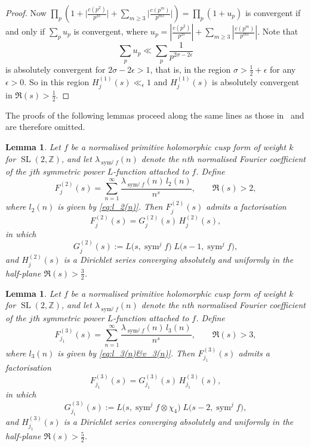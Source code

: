 \documentclass[10pt]{amsart}
\newtheorem{lemma}[theorem]{Lemma}
\begin{document}
\begin{proof}
         Now $\prod_p\left(1 + \bigg|\frac{c(p^2)}{p^{2s}}\bigg|+ \sum_{m\geq 3} \bigg|\frac{c(p^m)}{p^{ms}}\bigg|\right) = \prod_p\left(1+u_p\right)$ is convergent if and only if $\sum_pu_p$ is convergent, where $u_p = |\frac{c(p^2)}{p^{2s}}|+\sum_{m \geq 3}|\frac
         {c(p^m)}{p^{ms}}|$. Note that $$ \sum_pu_p \ll  \sum_p \frac{1}{p^{2\sigma -2\epsilon}} $$ is absolutely convergent for $2\sigma -2\epsilon > 1$, that is, in the region $\sigma > \frac{1}{2}+\epsilon$ for any $\epsilon >0$. So in this region $H_j^{(1)}(s) \ll_\epsilon 1$ and $H_j^{(1)}(s)$ is absolutely convergent in $\Re(s) > \frac{1}{2}$. 
\end{proof}
The proofs of the following lemmas proceed along the same lines as those in~\cite{Kaur2026, SharmaSankaranarayanan2023} and are therefore omitted.
\begin{lemma} \label{lem:F2}
Let \(f\) be a normalised primitive holomorphic cusp form of weight \(k\) for \(\operatorname{SL}(2,\mathbb{Z})\), 
and let \(\lambda_{\operatorname{sym}^{j}f}(n)\) denote the \(n\)th normalised Fourier coefficient 
of the \(j\)th symmetric power \(L\)-function attached to \(f\).  Define
\[
F_{j}^{(2)}(s)=\sum_{n=1}^{\infty}\frac{\lambda_{\operatorname{sym}^{j}f}(n)\,l_2(n)}{n^{s}}, \qquad \Re(s)>2,
\]
where \(l_2(n)\) is given by \eqref{eq:l_2(n)}. Then \(F_{j}^{(2)}(s)\) admits a factorisation
\[
F_{j}^{(2)}(s)=G_{j}^{(2)}(s)\,H_{j}^{(2)}(s),
\]
in which
\[
G_{j}^{(2)}(s):=L\!\bigl(s,\operatorname{sym}^{j}f\bigr)\; 
        L\!\bigl(s-1,\operatorname{sym}^{j}f\bigr),
\]
and \(H_{j}^{(2)}(s)\) is a Dirichlet series converging absolutely and uniformly 
in the half-plane \(\Re(s)>\frac{3}{2}\).
\end{lemma}


\begin{lemma} \label{lem:F3'}
Let \(f\) be a normalised primitive holomorphic cusp form of weight \(k\) for \(\operatorname{SL}(2,\mathbb{Z})\), 
and let \(\lambda_{\operatorname{sym}^{j}f}(n)\) denote the \(n\)th normalised Fourier coefficient 
of the \(j\)th symmetric power \(L\)-function attached to \(f\). Define
\[
F_{j_1}^{(3)}(s)=\sum_{n=1}^{\infty}\frac{\lambda_{\operatorname{sym}^{j}f}(n)\,l_3(n)}{n^{s}}, \qquad \Re(s)>3,
\]
where \(l_3(n)\) is given by \eqref{eq:l_3(n)&v_3(n)}.  Then \(F_{j_1}^{(3)}(s)\) admits a factorisation
\[
F_{j_1}^{(3)}(s)=G_{j_1}^{(3)}(s)\,H_{j_1}^{(3)}(s),
\]
in which
\[
G_{j_1}^{(3)}(s):=L\!\bigl(s,\operatorname{sym}^{j}f \otimes \chi_4\bigr)\; 
        L\!\bigl(s-2,\operatorname{sym}^{j}f\bigr),
\]
and \(H_{j_1}^{(3)}(s)\) is a Dirichlet series converging absolutely and uniformly 
in the half-plane \(\Re(s)>\frac{5}{2}\).
\end{lemma}
\end{document}
